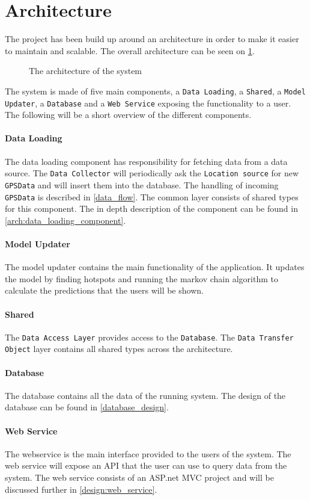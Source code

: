 \section{Architecture}
The project has been build up around an architecture in order to make it easier to maintain and scalable.
The overall architecture can be seen on \cref{arch}.

\begin{figure}[h]
\center

\caption{The architecture of the system}
\label{arch}
\end{figure}

The system is made of five main components, a \texttt{Data Loading}, a \texttt{Shared}, a \texttt{Model Updater}, a \texttt{Database} and a \texttt{Web Service} exposing the functionality to a user.
The following will be a short overview of the different components.

\paragraph{Data Loading}
The data loading component has responsibility for fetching data from a data source.
The \texttt{Data Collector} will periodically ask the \texttt{Location source} for new \texttt{GPSData} and will insert them into the database. 
The handling of incoming \texttt{GPSData} is described in  \cref{data_flow}.
The common layer consists of shared types for this component.
The in depth description of the component can be found in \cref{arch:data_loading_component}.

\paragraph{Model Updater}
The model updater contains the main functionality of the application.
It updates the model by finding hotspots and running the markov chain algorithm to calculate the predictions that the users will be shown.

\paragraph{Shared}
The \texttt{Data Access Layer} provides access to the \texttt{Database}.
The \texttt{Data Transfer Object} layer contains all shared types across the architecture.

\paragraph{Database}
The database contains all the data of the running system.
The design of the database can be found in \cref{database_design}.

\paragraph{Web Service}
The webservice is the main interface provided to the users of the system.
The web service will expose an API that the user can use to query data from the system.
The web service consists of an ASP.net MVC project and will be discussed further in \cref{design:web_service}.





